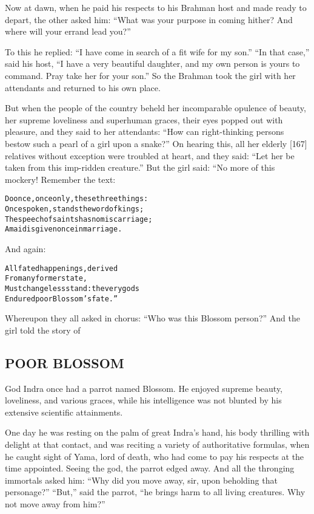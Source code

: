 \documentclass{article}
\renewenvironment{verbatim}{\begin{alltt}\normalfont\begin{centering}}{\end{centering}\end{alltt}}
\begin{document}
Now at dawn, when he paid his respects to his Brahman host and made
ready to depart, the other asked him:
``What was your purpose in coming hither? And where will your errand lead you?''

To this he replied:
``I have come in search of a fit wife for my son.''
``In that case,'' said his host,
``I have a very beautiful daughter, and my own person is yours to command. Pray take her for your son.''
So the Brahman took the girl with her attendants and returned to
his own place.

But when the people of the country beheld her incomparable opulence
of beauty, her supreme loveliness and superhuman graces, their eyes
popped out with pleasure, and they said to her attendants:
``How can right-thinking persons bestow such a pearl of a girl upon a snake?''
On hearing this, all her elderly [167] relatives without exception
were troubled at heart, and they said:
``Let her be taken from this imp-ridden creature.'' But the girl
said: “No more of this mockery! Remember the text:

\begin{verbatim}
Do once, once only, these three things:
Once spoken, stands the word of kings;
The speech of saints has no miscarriage;
A maid is given once in marriage.
\end{verbatim}
And again:

\begin{verbatim}
All fated happenings, derived
    From any former state,
Must changeless stand: the very gods
    Endured poor Blossom's fate.”
\end{verbatim}
Whereupon they all asked in chorus:
``Who was this Blossom person?'' And the girl told the story of

\subsection{POOR BLOSSOM}

God Indra once had a parrot named Blossom. He enjoyed supreme
beauty, loveliness, and various graces, while his intelligence was
not blunted by his extensive scientific attainments.

One day he was resting on the palm of great Indra's hand, his body
thrilling with delight at that contact, and was reciting a variety
of authoritative formulas, when he caught sight of Yama, lord of
death, who had come to pay his respects at the time appointed.
Seeing the god, the parrot edged away. And all the thronging
immortals asked him:
``Why did you move away, sir, upon beholding that personage?''
``But,'' said the parrot,
``he brings harm to all living creatures. Why not move away from him?''
\end{document}
